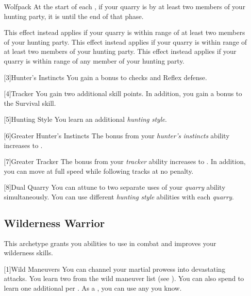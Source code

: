 {            \begin{freeability}{Wolfpack}
                At the start of each , if your quarry is  by at least two members of your hunting party, it is  until the end of that phase.

                \rankline
                 This effect instead applies if your quarry is within \rngmed range of at least two members of your hunting party.
                 This effect instead applies if your quarry is within \rnglong range of at least two members of your hunting party.
                 This effect instead applies if your quarry is within \rnglong range of any member of your hunting party.
            \end{freeability}
        }

        [3]{Hunter's Instincts} You gain a  bonus to  checks and Reflex defense.

        [4]{Tracker} You gain two additional skill points.
        In addition, you gain a  bonus to the Survival skill.

        [5]{Hunting Style}
        You learn an additional \textit{hunting style}.

        [6]{Greater Hunter's Instincts}
        The bonus from your \textit{hunter's instincts} ability increases to .

        [7]{Greater Tracker} The bonus from your \textit{tracker} ability increases to .
        In addition, you can move at full speed while following tracks at no penalty.

        [8]{Dual Quarry} You can attune to two separate uses of your \textit{quarry} ability simultaneously.
        You can use different \textit{hunting style} abilities with each \textit{quarry}.

    \subsection{Wilderness Warrior}
        This archetype grants you abilities to use in combat and improves your wilderness skills.

        [1]{Wild Maneuvers} 
        You can channel your martial prowess into devastating attacks.
        You learn two  from the wild maneuver list (see ).
        You can also spend  to learn one additional  per .
        As a , you can use any  you know.

